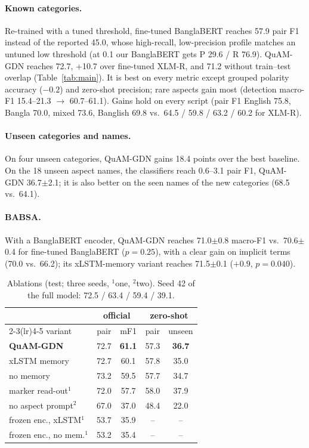 \documentclass[11pt]{article}
\newcommand{\pmstd}[2]{#1{\scriptsize$\pm$#2}}
\newcommand{\quam}{QuAM-GDN}
\begin{document}
\paragraph{Known categories.} Re-trained with a tuned threshold, fine-tuned BanglaBERT reaches 57.9
pair F1 instead of the reported 45.0, whose high-recall, low-precision profile matches an untuned low
threshold (at 0.1 our BanglaBERT gets P 29.6 / R 76.9). \quam{} reaches 72.7, +10.7 over fine-tuned
XLM-R, and 71.2 without train--test overlap (Table~\ref{tab:main}). It is best on every metric except
grouped polarity accuracy ($-0.2$) and zero-shot precision; rare aspects gain most (detection macro-F1
15.4--21.3 $\rightarrow$ 60.7--61.1). Gains hold on every script (pair F1 English 75.8, Bangla 70.0,
mixed 73.6, Banglish 69.8 vs.\ 64.5 / 59.8 / 63.2 / 60.2 for XLM-R).

\paragraph{Unseen categories and names.} On four unseen categories, \quam{} gains 18.4 points over the
best baseline. On the 18 unseen aspect names, the classifiers reach 0.6--3.1 pair F1, \quam{}
\pmstd{36.7}{2.1}; it is also better on the seen names of the new categories (68.5 vs.\ 64.1).

\paragraph{BABSA.} With a BanglaBERT encoder, \quam{} reaches \pmstd{71.0}{0.8} macro-F1 vs.\
\pmstd{70.6}{0.4} for fine-tuned BanglaBERT ($p=0.25$), with a clear gain on implicit terms (70.0 vs.\
66.2); its xLSTM-memory variant reaches \pmstd{71.5}{0.1} ($+0.9$, $p=0.040$).

\begin{table}[t]
\centering\footnotesize
\setlength{\tabcolsep}{3pt}
\begin{tabular}{lcccc}
\toprule
 & \multicolumn{2}{c}{official} & \multicolumn{2}{c}{zero-shot} \\
\cmidrule(lr){2-3}\cmidrule(lr){4-5}
variant & pair & mF1 & pair & unseen \\
\midrule
\textbf{\quam{}} & 72.7 & \textbf{61.1} & 57.3 & \textbf{36.7} \\
\quad xLSTM memory & 72.7 & 60.1 & 57.8 & 35.0 \\
\quad no memory & 73.2 & 59.5 & 57.7 & 34.7 \\
\quad marker read-out$^{1}$ & 72.0 & 57.7 & 58.0 & 37.9 \\
\quad no aspect prompt$^{2}$ & 67.0 & 37.0 & 48.4 & 22.0 \\
\quad frozen enc., xLSTM$^{1}$ & 53.7 & 35.9 & -- & -- \\
\quad frozen enc., no mem.$^{1}$ & 53.2 & 35.4 & -- & -- \\
\bottomrule
\end{tabular}
\caption{Ablations (test; three seeds, $^1$one, $^2$two). Seed 42 of the full model: 72.5 / 63.4 /
59.4 / 39.1.}
\label{tab:abl}
\end{table}
\end{document}
